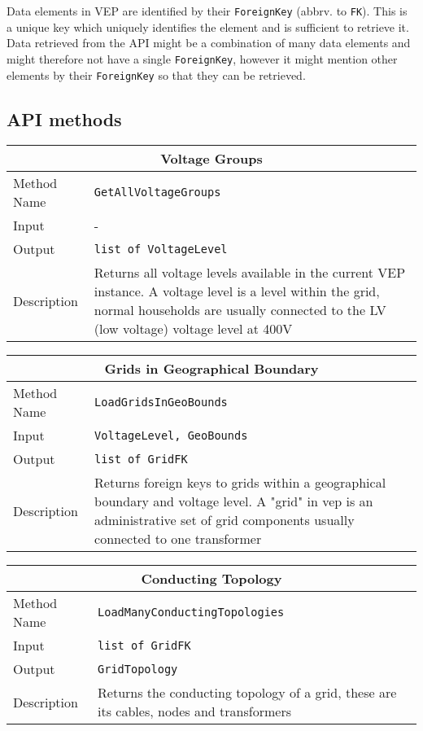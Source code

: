 Data elements in VEP are identified by their \texttt{ForeignKey} (abbrv. to \texttt{FK}). This is a unique key which
uniquely identifies the element and is sufficient to retrieve it. Data retrieved from the API might
be a combination of many data elements and might therefore not have a single \texttt{ForeignKey}, however
it might mention other elements by their \texttt{ForeignKey} so that they can be retrieved.

\subsection{API methods}

\begin{tabular}{ l  p{12cm}} 
    \hline
    \multicolumn{2}{c}{\textbf{Voltage Groups}}\\
    \hline
    Method Name     & \texttt{GetAllVoltageGroups} \\
    Input           & -\\
    Output          & \texttt{list of VoltageLevel} \\
    Description     & Returns all voltage levels available in the current VEP instance. A voltage level is a level within the grid, normal households are usually connected to the LV (low voltage) voltage level at 400V\\
\end{tabular}

\vspace{.5cm}

\begin{tabular}{ l  p{12cm}} 
    \hline
    \multicolumn{2}{c}{\textbf{Grids in Geographical Boundary}}\\
    \hline
    Method Name     & \texttt{LoadGridsInGeoBounds} \\
    Input           & \texttt{VoltageLevel, GeoBounds}\\
    Output          & \texttt{list of GridFK}\\
    Description     & Returns foreign keys to grids within a geographical boundary and voltage level. A "grid" in vep is an administrative set of grid components usually connected to one transformer\\
\end{tabular}

\vspace{.5cm}

\begin{tabular}{ l  p{12cm}} 
    \hline
    \multicolumn{2}{c}{\textbf{Conducting Topology}}\\
    \hline
    Method Name     & \texttt{LoadManyConductingTopologies} \\
    Input           & \texttt{list of GridFK}\\
    Output          & \texttt{GridTopology} \\
    Description     & Returns the conducting topology of a grid, these are its cables, nodes and transformers\\
\end{tabular}


